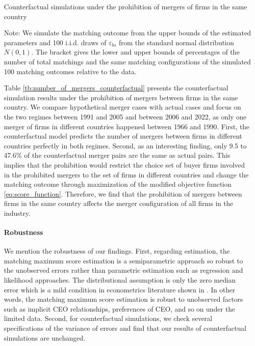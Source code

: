 \documentclass[10pt]{article}
\begin{document}
\begin{table}[!htbp]
  \begin{center}
      \caption{Counterfactual simulations under the prohibition of mergers of firms in the same country}
      \label{tb:number_of_mergers_counterfactual} 
      
  \end{center}\footnotesize
  Note: We simulate the matching outcome from the upper bounds of the estimated parameters and 100 i.i.d. draws of $\varepsilon_{bs}$ from the standard normal distribution $N(0,1)$. The bracket gives the lower and upper bounds of percentages of the number of total matchings and the same matching configurations of the simulated 100 matching outcomes relative to the data.
\end{table} 

Table \ref{tb:number_of_mergers_counterfactual} presents the counterfactual simulation results under the prohibition of mergers between firms in the same country. 
We compare hypothetical merger cases with actual cases and focus on the two regimes between 1991 and 2005 and between 2006 and 2022, as only one merger of firms in different countries happened between 1966 and 1990.
First, the counterfactual model predicts the number of mergers between firms in different countries perfectly in both regimes. 
Second, as an interesting finding, only 9.5 to 47.6\% of the counterfactual merger pairs are the same as actual pairs.
This implies that the prohibition would restrict the choice set of buyer firms involved in the prohibited mergers to the set of firms in different countries and change the matching outcome through maximization of the modified objective function \eqref{eq:score_function}.
Therefore, we find that the prohibition of mergers between firms in the same country affects the merger configuration of all firms in the industry.

\paragraph{Robustness}
We mention the robustness of our findings. First, regarding estimation, the matching maximum score estimation is a semiparametric approach so robust to the unobserved errors rather than parametric estimation such as regression and likelihood approaches. The distributional assumption is only the zero median error which is a mild condition in econometrics literature shown in \cite{manski1985semiparametric}. In other words, the matching maximum score estimation is robust to unobserved factors such as implicit CEO relationships, preferences of CEO, and so on under the limited data. 
Second, for counterfactual simulations, we check several specifications of the variance of errors and find that our results of counterfactual simulations are unchanged. 
\end{document}
